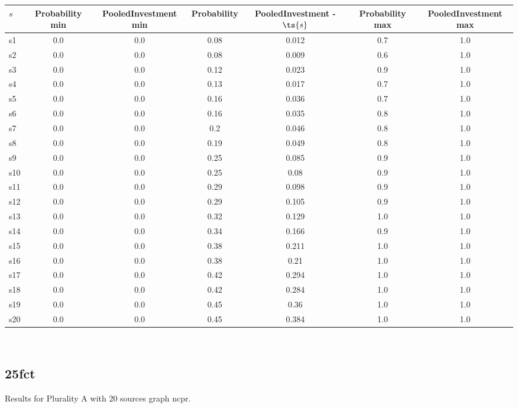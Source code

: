 \documentclass{article}
\begin{document}
\noindent\begin{tabular}{|l|c|c|c|c|c|c|}
\hline
$s$& Probability min & PooledInvestment min & Probability & PooledInvestment - $\ts{s}$ & Probability max & PooledInvestment max\\
\hline
s1 &0.0 & 0.0 & 0.08 & 0.012 & 0.7 & 1.0\\
\hline
s2 &0.0 & 0.0 & 0.08 & 0.009 & 0.6 & 1.0\\
\hline
s3 &0.0 & 0.0 & 0.12 & 0.023 & 0.9 & 1.0\\
\hline
s4 &0.0 & 0.0 & 0.13 & 0.017 & 0.7 & 1.0\\
\hline
s5 &0.0 & 0.0 & 0.16 & 0.036 & 0.7 & 1.0\\
\hline
s6 &0.0 & 0.0 & 0.16 & 0.035 & 0.8 & 1.0\\
\hline
s7 &0.0 & 0.0 & 0.2 & 0.046 & 0.8 & 1.0\\
\hline
s8 &0.0 & 0.0 & 0.19 & 0.049 & 0.8 & 1.0\\
\hline
s9 &0.0 & 0.0 & 0.25 & 0.085 & 0.9 & 1.0\\
\hline
s10 &0.0 & 0.0 & 0.25 & 0.08 & 0.9 & 1.0\\
\hline
s11 &0.0 & 0.0 & 0.29 & 0.098 & 0.9 & 1.0\\
\hline
s12 &0.0 & 0.0 & 0.29 & 0.105 & 0.9 & 1.0\\
\hline
s13 &0.0 & 0.0 & 0.32 & 0.129 & 1.0 & 1.0\\
\hline
s14 &0.0 & 0.0 & 0.34 & 0.166 & 0.9 & 1.0\\
\hline
s15 &0.0 & 0.0 & 0.38 & 0.211 & 1.0 & 1.0\\
\hline
s16 &0.0 & 0.0 & 0.38 & 0.21 & 1.0 & 1.0\\
\hline
s17 &0.0 & 0.0 & 0.42 & 0.294 & 1.0 & 1.0\\
\hline
s18 &0.0 & 0.0 & 0.42 & 0.284 & 1.0 & 1.0\\
\hline
s19 &0.0 & 0.0 & 0.45 & 0.36 & 1.0 & 1.0\\
\hline
s20 &0.0 & 0.0 & 0.45 & 0.384 & 1.0 & 1.0\\
\hline
\end{tabular}\\

\newpage

\subsection{25fct}

\noindent Results for Plurality A with 20 sources graph ncpr.
\end{document}

